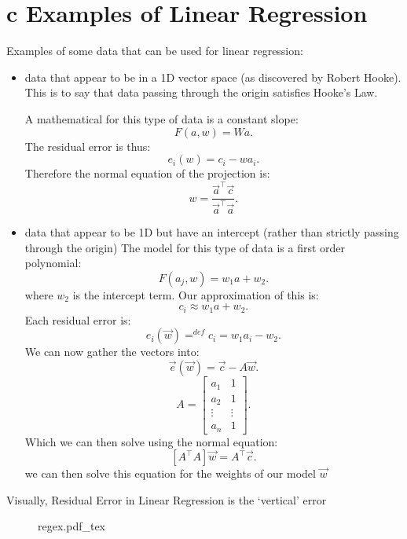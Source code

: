 \documentclass[12pt]{book}
\newcommand{\incfig}[1]{%
    {#1.pdf_tex}
}
\begin{document}
\section*{c Examples of Linear Regression}
Examples of some data that can be used for linear regression:
\begin{itemize}
        \item data that appear to be in a 1D vector space (as discovered by Robert Hooke). This is to say that data passing 
                through the origin satisfies Hooke's Law.

                A mathematical for this type of data is a constant slope:
                \[
                F(a,w) = Wa
                .\] 
                The residual error is thus:
                \[
                e_i(w) = c_i -wa_i
                .\] 
                Therefore the normal equation of the projection is:
                \[
                w = \frac{\vec a^\top \vec c}{\vec a^\top \vec a}
                 .\] 
        \item data that appear to be 1D but have an intercept (rather than strictly passing through the origin)
                The model for this type of data is a first order polynomial:
                \[
                F(a_j, w) = w_1a + w_2
                .\] 
                where $w_2$ is the intercept term. Our approximation of this is:
                \[
                c_i \approx w_1a+w_2
                .\] 
                Each residual error is:
                \[
                e_i(\vec w) =^{def} c_i = w_1a_i - w_2
                .\] 
                We can now gather the vectors into:
                \[
                \vec e(\vec w) = \vec c - A\vec w
                .\] 
                \[
                        A = \begin{bmatrix} a_1 & 1\\a_2 & 1 \\ \vdots&\vdots \\a_n &1 \end{bmatrix} 
                .\] 
                Which we can then solve using the normal equation:
                \[
                [A^\top A]\vec w = A^\top \vec c
                .\] 
                we can then solve this equation for the weights of our model $\vec w$
\end{itemize}
\pagebreak

Visually, Residual Error in Linear Regression is the `vertical' error 
\begin{figure}[h]
        \centering
        \incfig{regex}
\end{figure}
\end{document}

